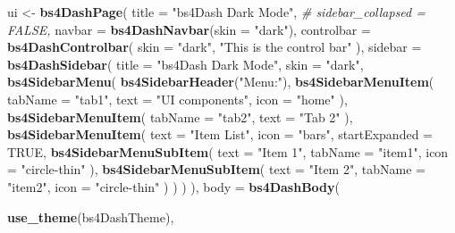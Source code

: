 \documentclass[]{book}
\newenvironment{Shaded}{\begin{snugshade}}{\end{snugshade}}
\newcommand{\CommentTok}[1]{\textcolor[rgb]{0.56,0.35,0.01}{\textit{#1}}}
\newcommand{\DataTypeTok}[1]{\textcolor[rgb]{0.13,0.29,0.53}{#1}}
\newcommand{\KeywordTok}[1]{\textcolor[rgb]{0.13,0.29,0.53}{\textbf{#1}}}
\newcommand{\NormalTok}[1]{#1}
\newcommand{\OtherTok}[1]{\textcolor[rgb]{0.56,0.35,0.01}{#1}}
\newcommand{\StringTok}[1]{\textcolor[rgb]{0.31,0.60,0.02}{#1}}
\begin{document}
\begin{Shaded}
\begin{Highlighting}[]
\NormalTok{ui <-}\StringTok{ }\KeywordTok{bs4DashPage}\NormalTok{(}
  \DataTypeTok{title =} \StringTok{"bs4Dash Dark Mode"}\NormalTok{,}
  \CommentTok{# sidebar_collapsed = FALSE,}
  \DataTypeTok{navbar =} \KeywordTok{bs4DashNavbar}\NormalTok{(}\DataTypeTok{skin =} \StringTok{"dark"}\NormalTok{),}
  \DataTypeTok{controlbar =} \KeywordTok{bs4DashControlbar}\NormalTok{(}
    \DataTypeTok{skin =} \StringTok{"dark"}\NormalTok{,}
    \StringTok{"This is the control bar"}
\NormalTok{  ),}
  \DataTypeTok{sidebar =} \KeywordTok{bs4DashSidebar}\NormalTok{(}
    \DataTypeTok{title =} \StringTok{"bs4Dash Dark Mode"}\NormalTok{,}
    \DataTypeTok{skin =} \StringTok{"dark"}\NormalTok{,}
    \KeywordTok{bs4SidebarMenu}\NormalTok{(}
      \KeywordTok{bs4SidebarHeader}\NormalTok{(}\StringTok{"Menu:"}\NormalTok{),}
      \KeywordTok{bs4SidebarMenuItem}\NormalTok{(}
        \DataTypeTok{tabName =} \StringTok{"tab1"}\NormalTok{,}
        \DataTypeTok{text =} \StringTok{"UI components"}\NormalTok{,}
        \DataTypeTok{icon =} \StringTok{"home"}
\NormalTok{      ),}
      \KeywordTok{bs4SidebarMenuItem}\NormalTok{(}
        \DataTypeTok{tabName =} \StringTok{"tab2"}\NormalTok{,}
        \DataTypeTok{text =} \StringTok{"Tab 2"}
\NormalTok{      ),}
      \KeywordTok{bs4SidebarMenuItem}\NormalTok{(}
        \DataTypeTok{text =} \StringTok{"Item List"}\NormalTok{,}
        \DataTypeTok{icon =} \StringTok{"bars"}\NormalTok{,}
        \DataTypeTok{startExpanded =} \OtherTok{TRUE}\NormalTok{,}
        \KeywordTok{bs4SidebarMenuSubItem}\NormalTok{(}
          \DataTypeTok{text =} \StringTok{"Item 1"}\NormalTok{,}
          \DataTypeTok{tabName =} \StringTok{"item1"}\NormalTok{,}
          \DataTypeTok{icon =} \StringTok{"circle-thin"}
\NormalTok{        ),}
        \KeywordTok{bs4SidebarMenuSubItem}\NormalTok{(}
          \DataTypeTok{text =} \StringTok{"Item 2"}\NormalTok{,}
          \DataTypeTok{tabName =} \StringTok{"item2"}\NormalTok{,}
          \DataTypeTok{icon =} \StringTok{"circle-thin"}
\NormalTok{        )}
\NormalTok{      )}
\NormalTok{    )}
\NormalTok{  ),}
  \DataTypeTok{body =} \KeywordTok{bs4DashBody}\NormalTok{(}

    \KeywordTok{use_theme}\NormalTok{(bs4DashTheme),}


\end{Highlighting}
\end{Shaded}
\end{document}
